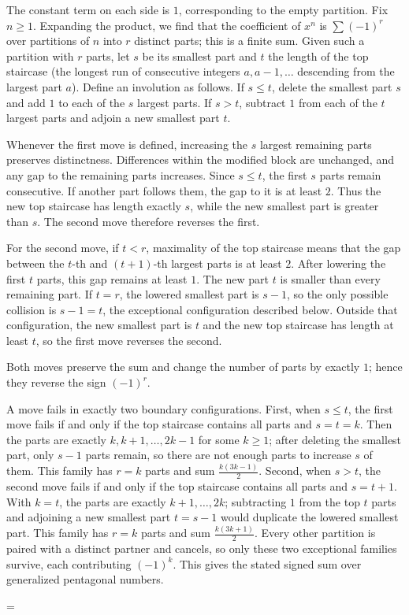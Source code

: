 \documentclass[11pt]{article}
\makeatletter
\theoremstyle{ntstyle}
\let\nt@closedisplay\]
\def\nt@guardedclose{\@ifnextchar\par{\nt@closeafterpar}{\@ifnextchar\end{\postdisplaypenalty\@M\nt@closedisplay}{\nt@closedisplay}}}
\def\nt@closeafterpar\par{\@ifnextchar\par{\nt@closeafterpar}{\@ifnextchar\end{\postdisplaypenalty\@M\nt@closedisplay\par}{\nt@closedisplay\par}}}
\renewenvironment{proof}[1][\proofname]{\par
  \pushQED{\qed}\normalfont\topsep\medskipamount\edef\nt@afterproof{\@endparpenalty=\the\@endparpenalty\relax}\@beginparpenalty\@M\@endparpenalty\@M\let\]\nt@guardedclose\trivlist\item[]\textit{#1\@addpunct{.}} \ignorespaces}{\ifvmode\addpenalty\@M\fi\popQED\nt@afterproof\endtrivlist\@endpefalse}
\makeatother
\begin{document}
\begin{proof} The constant term on each side is $1$, corresponding to
	the empty partition. Fix $n\ge1$. Expanding the product, we find that the coefficient
	of $x^n$ is $\sum(-1)^r$ over partitions of $n$ into $r$ distinct parts;
	this is a finite sum. Given such a partition with $r$ parts, let $s$ be its smallest
	part and $t$ the length of the top staircase (the
	longest run of consecutive integers $a,a-1,\ldots$ descending from the
	largest part $a$). Define an involution as follows. If $s\le t$,
	delete the smallest part $s$ and add $1$ to each of the $s$ largest
	parts. If $s>t$, subtract $1$ from each of the $t$ largest
	parts and adjoin a new smallest part $t$.

	Whenever the first move is defined, increasing the $s$ largest
	remaining parts preserves distinctness. Differences within the
	modified block are unchanged, and any gap to the remaining parts
	increases. Since $s\le t$, the first $s$ parts remain consecutive.
	If another part follows them, the gap to it is at least $2$.
	Thus the new top staircase has length exactly $s$, while the new
	smallest part is greater than $s$. The second move therefore
	reverses the first.

	For the second move, if $t<r$, maximality of the top staircase
	means that the gap between the $t$-th and $(t+1)$-th largest parts
	is at least $2$. After lowering the first $t$ parts, this gap
	remains at least $1$. The new part $t$ is smaller than every
	remaining part. If $t=r$, the lowered smallest part is $s-1$,
	so the only possible collision is $s-1=t$, the exceptional
	configuration described below. Outside that configuration, the
	new smallest part is $t$ and the new top staircase has length
	at least $t$, so the first move reverses the second.

	Both moves preserve the sum and change the number of parts by exactly $1$; hence they reverse the sign $(-1)^r$.

	A move fails in exactly two boundary configurations. First, when
	$s\le t$, the first move fails if and only if the top staircase
	contains all parts and $s=t=k$. Then the parts are exactly
	$k,k+1,\ldots,2k-1$ for some $k\ge1$; after deleting the smallest part,
	only $s-1$ parts remain, so there are not enough parts to increase $s$ of them.
	This family has $r=k$ parts and sum $\tfrac{k(3k-1)}{2}$. Second, when
	$s>t$, the second move fails if and only if the top staircase
	contains all parts and $s=t+1$. With $k=t$, the parts are
	exactly $k+1,\ldots,2k$; subtracting $1$ from the top $t$ parts
	and adjoining a new smallest part $t=s-1$ would duplicate the
	lowered smallest part. This family has $r=k$ parts and sum
	$\tfrac{k(3k+1)}{2}$. Every other partition is
	paired with a distinct partner and cancels, so only these two
	exceptional families survive, each contributing $(-1)^k$. This gives
	the stated signed sum over generalized pentagonal numbers.

\end{proof}
\end{document}
